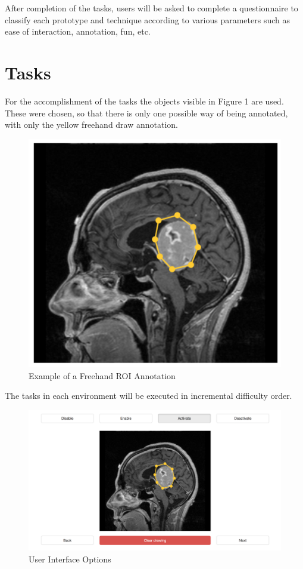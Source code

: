 \documentclass{article}
\begin{document}
After completion of the tasks, users will be asked to complete a questionnaire to classify each prototype and technique according to various parameters such as ease of interaction, annotation, fun, etc.

\section{Tasks}

For the accomplishment of the tasks the objects visible in Figure 1 are used. These were chosen, so that there is only one possible way of being annotated, with only the yellow freehand draw annotation.

\begin{figure}[h]
\caption{Example of a Freehand ROI Annotation}
\centering
\includegraphics[width=\textwidth]{img1.png}
\end{figure}

\clearpage

The tasks in each environment will be executed in incremental difficulty order.

\begin{figure}[h]
\caption{User Interface Options}
\centering
\includegraphics[width=\textwidth]{img2.png}
\end{figure}
\end{document}
